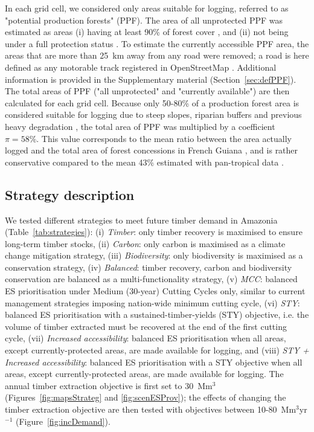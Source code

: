 \documentclass[12pt]{article}
\begin{document}
In each grid cell, we considered only areas suitable for logging, referred to as "potential production forests" (PPF). The area of all unprotected PPF was estimated as areas (i) having at least 90\% of forest cover \cite{Hansen2013}, and (ii) not being under a full protection status \cite{WDPA2016}. To estimate the currently accessible PPF area, the areas that are more than 25~km away from any road were removed; a road is here defined as any motorable track registered in OpenStreetMap \cite{OSM2018}. Additional information is provided in the Supplementary material (Section~\ref{sec:defPPF}). 
The total areas of PPF ("all unprotected" and "currently available") are then calculated for each grid cell. Because only 50-80\% of a production forest area is considered suitable for logging due to steep slopes, riparian buffers and previous heavy degradation \cite{Feldpausch2006,Verissimo2002}, the total area of PPF was multiplied by a coefficient $\pi = 58\%$. This value corresponds to the mean ratio between the area actually logged and the total area of forest concessions in French Guiana \cite{Piponiot2019}, and is rather conservative compared to the mean 43\% estimated with pan-tropical data \cite{Putz2019}.

\subsection*{Strategy description}

We tested different strategies to meet future timber demand in Amazonia (Table~\ref{tab:strategies}): (i) \textit{Timber}: only timber recovery is maximised to ensure long-term timber stocks, (ii) \textit{Carbon}: only carbon is maximised as a climate change mitigation strategy, (iii) \textit{Biodiversity}: only biodiversity is maximised as a conservation strategy, (iv) \textit{Balanced}: timber recovery, carbon and biodiversity conservation are balanced as a multi-functionality strategy, (v) \textit{MCC}: balanced ES prioritisation under Medium (30-year) Cutting Cycles only, similar to current management strategies imposing nation-wide minimum cutting cycle, (vi) \textit{STY}: balanced ES prioritisation with a sustained-timber-yields (STY) objective, i.e. the volume of timber extracted must be recovered at the end of the first cutting cycle, (vii) \textit{Increased accessibility}: balanced ES prioritisation when all areas, except currently-protected areas, are made available for logging, and (viii) \textit{STY + Increased accessibility}: balanced ES prioritisation with a STY objective when all areas, except currently-protected areas, are made available for logging. The annual timber extraction objective is first set to 30~Mm$^3$ (Figures~\ref{fig:mapsStrateg} and \ref{fig:scenESProv}); the effects of changing the timber extraction objective are then tested with objectives between 10-80~Mm$^3$yr$^{-1}$ (Figure~\ref{fig:incDemand}). 
\end{document}
